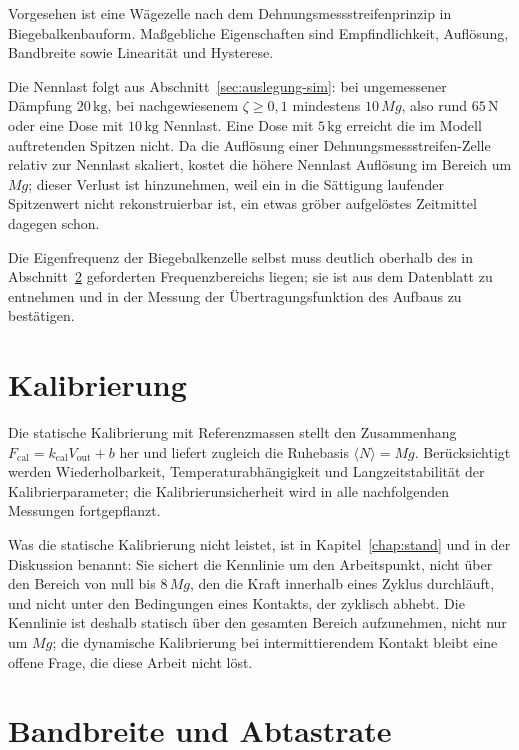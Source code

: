 \documentclass[12pt,a4paper]{report}
\begin{document}
Vorgesehen ist eine Wägezelle nach dem Dehnungsmessstreifenprinzip in
Biegebalkenbauform. Maßgebliche Eigenschaften sind Empfindlichkeit,
Auflösung, Bandbreite sowie Linearität und Hysterese.

Die Nennlast folgt aus Abschnitt~\ref{sec:auslegung-sim}: bei
ungemessener Dämpfung $20\,\mathrm{kg}$, bei nachgewiesenem
$\zeta \geq 0{,}1$ mindestens $10\,Mg$, also rund $65\,\mathrm{N}$
oder eine Dose mit $10\,\mathrm{kg}$ Nennlast. Eine Dose mit $5\,\mathrm{kg}$ erreicht die
im Modell auftretenden Spitzen nicht. Da die Auflösung einer
Dehnungsmessstreifen-Zelle relativ zur Nennlast skaliert, kostet die
höhere Nennlast Auflösung im Bereich um $Mg$; dieser Verlust ist
hinzunehmen, weil ein in die Sättigung laufender Spitzenwert nicht
rekonstruierbar ist, ein etwas gröber aufgelöstes Zeitmittel dagegen
schon.

Die Eigenfrequenz der Biegebalkenzelle selbst muss deutlich oberhalb
des in Abschnitt~\ref{sec:bandbreite} geforderten Frequenzbereichs
liegen; sie ist aus dem Datenblatt zu entnehmen und in der Messung der
Übertragungsfunktion des Aufbaus zu bestätigen.

\section{Kalibrierung}

Die statische Kalibrierung mit Referenzmassen stellt den Zusammenhang
$F_{\mathrm{cal}} = k_{\mathrm{cal}} V_{\mathrm{out}} + b$ her und liefert
zugleich die Ruhebasis $\langle N \rangle = Mg$. Berücksichtigt werden
Wiederholbarkeit, Temperaturabhängigkeit und Langzeitstabilität der
Kalibrierparameter; die Kalibrierunsicherheit wird in alle nachfolgenden
Messungen fortgepflanzt.

Was die statische Kalibrierung nicht leistet, ist in
Kapitel~\ref{chap:stand} und in der Diskussion benannt: Sie sichert die
Kennlinie um den Arbeitspunkt, nicht über den Bereich von null bis
$8\,Mg$, den die Kraft innerhalb eines Zyklus durchläuft, und nicht
unter den Bedingungen eines Kontakts, der zyklisch abhebt. Die
Kennlinie ist deshalb statisch über den gesamten Bereich aufzunehmen,
nicht nur um $Mg$; die dynamische Kalibrierung bei intermittierendem
Kontakt bleibt eine offene Frage, die diese Arbeit nicht löst.

\section{Bandbreite und Abtastrate}
\label{sec:bandbreite}
\end{document}

